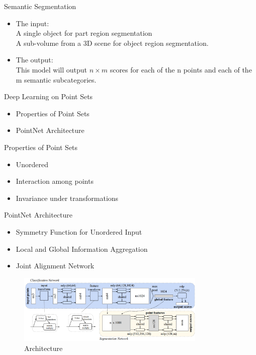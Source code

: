 \documentclass[serif,mathserif]{beamer}
\begin{document}
\begin{frame}{Semantic Segmentation}
	\begin{itemize}
		\item The input: \\
		A single object for part region segmentation \\
		A sub-volume from a 3D scene for object region segmentation.
		\item The output: \\
		This model will output $ n \times m $ scores for each of the n points and each of the m semantic    
		subcategories.
	\end{itemize}
\end{frame}

\begin{frame}{Deep Learning on Point Sets}
	\begin{itemize}
		\item Properties of Point Sets
		\item PointNet Architecture
	\end{itemize}
\end{frame}

\begin{frame}{Properties of Point Sets}
	\begin{itemize}
		\item Unordered
		\item Interaction among points
		\item Invariance under transformations
	\end{itemize}
\end{frame}

\begin{frame}{PointNet Architecture}
	\begin{itemize}
		\item Symmetry Function for Unordered Input
		\item Local and Global Information Aggregation
		\item Joint Alignment Network
	\end{itemize}
	\begin{figure}
		\includegraphics[width=9cm]{image/pointnet_arch.jpg}
		\caption{Architecture}
	\end{figure}
\end{frame}
\end{document}
